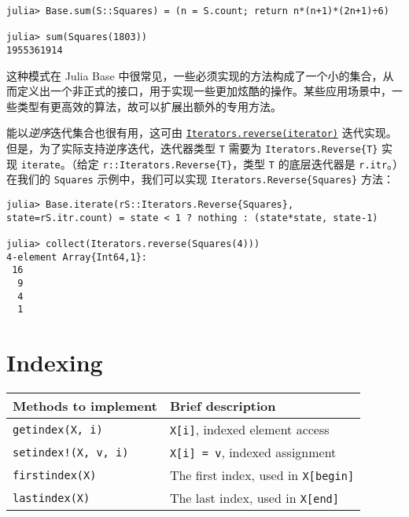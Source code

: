 \begin{verbatim}
julia> Base.sum(S::Squares) = (n = S.count; return n*(n+1)*(2n+1)÷6)

julia> sum(Squares(1803))
1955361914
\end{verbatim}



这种模式在 Julia Base 中很常见，一些必须实现的方法构成了一个小的集合，从而定义出一个非正式的接口，用于实现一些更加炫酷的操作。某些应用场景中，一些类型有更高效的算法，故可以扩展出额外的专用方法。



能以\emph{逆序}迭代集合也很有用，这可由 \hyperlink{12943296479800134710}{\texttt{Iterators.reverse(iterator)}} 迭代实现。但是，为了实际支持逆序迭代，迭代器类型 \texttt{T} 需要为 \texttt{Iterators.Reverse\{T\}} 实现 \texttt{iterate}。（给定 \texttt{r::Iterators.Reverse\{T\}}，类型 \texttt{T} 的底层迭代器是 \texttt{r.itr}。）在我们的 \texttt{Squares} 示例中，我们可以实现 \texttt{Iterators.Reverse\{Squares\}} 方法：




\begin{verbatim}
julia> Base.iterate(rS::Iterators.Reverse{Squares}, state=rS.itr.count) = state < 1 ? nothing : (state*state, state-1)

julia> collect(Iterators.reverse(Squares(4)))
4-element Array{Int64,1}:
 16
  9
  4
  1
\end{verbatim}



\hypertarget{14566118977838625303}{}


\section{Indexing}




\begin{table}[h]

\begin{tabulary}{\linewidth}{|L|L|}
\hline
Methods to implement & Brief description \\
\hline
\texttt{getindex(X, i)} & \texttt{X[i]}, indexed element access \\
\hline
\texttt{setindex!(X, v, i)} & \texttt{X[i] = v}, indexed assignment \\
\hline
\texttt{firstindex(X)} & The first index, used in \texttt{X[begin]} \\
\hline
\texttt{lastindex(X)} & The last index, used in \texttt{X[end]} \\
\hline
\end{tabulary}

\end{table}



